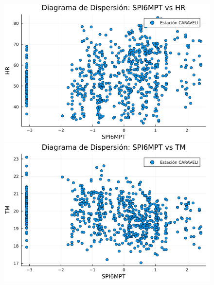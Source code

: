 \begin{figure}[htbp]
\begin{minipage}{0.32\textwidth}
\end{minipage}

\vspace{0.5cm}  %

\begin{minipage}{0.32\textwidth}
    \centering
    \includegraphics[width=\linewidth]{Capitulos/Scaterplot/CARAVELI_SPI6MPT_vs_HR.png}
\end{minipage}\hfill
\begin{minipage}{0.32\textwidth}
    \centering
    \includegraphics[width=\linewidth]{Capitulos/Scaterplot/CARAVELI_SPI6MPT_vs_TM.png}
\end{minipage}\hfill
\begin{minipage}{0.32\textwidth}
    \centering

\end{minipage}
\end{figure}
